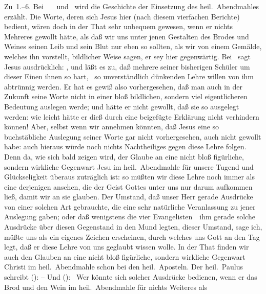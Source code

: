 Zu~1.--6. Bei \ \ \ und \ wird die Geschichte der Einsetzung des heil.\ Abendmahles erzählt. Die Worte, deren sich Jesus hier (nach diesem vierfachen Berichte) bedient, wären doch in der That sehr unbequem gewesen, wenn er nichts Mehreres gewollt hätte, als daß wir uns unter jenen Gestalten des Brodes und Weines seinen Leib und sein Blut nur eben so  sollten, als wir von einem Gemälde, welches ihn vorstellt, bildlicher Weise sagen, er sey hier gegenwärtig. Bei \ sagt Jesus ausdrücklich: , und läßt es zu, daß mehrere seiner bisherigen Schüler um dieser Einen ihnen so hart, \dh\  so unverständlich dünkenden Lehre willen von ihm abtrünnig werden. Er hat es gewiß also vorhergesehen, daß man auch in der Zukunft seine Worte nicht in einer bloß bildlichen, sondern viel eigentlicheren Bedeutung auslegen werde; und hätte er nicht gewollt, daß sie so ausgelegt werden: wie leicht hätte er dieß durch eine beigefügte Erklärung nicht verhindern können! Aber, selbst wenn wir annehmen könnten, daß Jesus eine so buchstäbliche Auslegung seiner Worte gar nicht vorhergesehen, auch nicht gewollt habe: auch hieraus würde noch nichts Nachtheiliges gegen diese Lehre folgen. Denn da, wie sich bald zeigen wird, der Glaube an eine nicht bloß figürliche, sondern wirkliche Gegenwart Jesu im heil.\ Abendmahle für unsere Tugend und Glückseligkeit überaus zuträglich ist: so müßten wir diese Lehre noch immer als eine derjenigen ansehen, die der Geist Gottes unter uns nur darum aufkommen ließ, damit wir an sie glauben. Der Umstand, daß unser Herr gerade Ausdrücke von einer solchen Art gebrauchte, die eine sehr natürliche Veranlassung zu jener Auslegung gaben; oder daß wenigstens die vier Evangelisten~\ ihm gerade solche Ausdrücke über diesen Gegenstand in den Mund legten, dieser Umstand, sage ich, müßte uns als ein eigenes Zeichen erscheinen, durch welches uns Gott an den Tag legt, daß er diese Lehre von uns geglaubt wissen wolle. In der That finden wir auch den Glauben an eine nicht bloß figürliche, sondern wirkliche Gegenwart Christi im heil.\ Abendmahle schon bei den heil.\ Aposteln. Der heil.\ Paulus schreibt ():  -- Und ():  \usw\ Wer könnte sich solcher Ausdrücke bedienen, wenn er das Brod und den Wein im heil.\ Abendmahle für nichts Weiteres als 